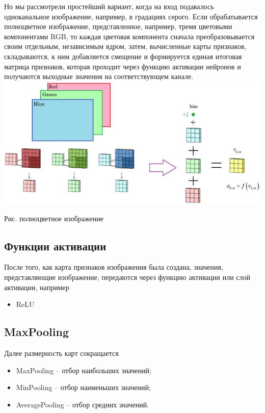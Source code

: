\documentclass{article}
\begin{document}
	Но мы рассмотрели простейший вариант, когда на вход подавалось одноканальное изображение, например, в градациях серого. Если обрабатывается полноцветное изображение, представленное, например, тремя цветовыми компонентами RGB, то каждая цветовая компонента сначала преобразовывается своим отдельным, независимым ядром, затем, вычисленные карты признаков, складываются, к ним добавляется смещение и формируется единая итоговая матрица признаков, которая проходит через функцию активации нейронов и получаются выходные значения на соответствующем канале.\\
	
	\noindent \includegraphics[width=\textwidth]{pic6.jpg}
	\begin{center}
		Рис. полноцветное изображение
	\end{center}
	
	\subsection{Функции активации}
	
	После того, как карта признаков изображения была создана, значения, представляющие изображение, передаются через функцию активации или слой активации, например
	\begin{itemize}
		\item ReLU
	\end{itemize}

	\subsection{MaxPooling}

	Далее размерность карт сокращается
	\begin{itemize}
		\item MaxPooling – отбор наибольших значений;
		\item MinPooling – отбор наименьших значений;
		\item AveragePooling – отбор средних значений.
	\end{itemize}
\end{document}
